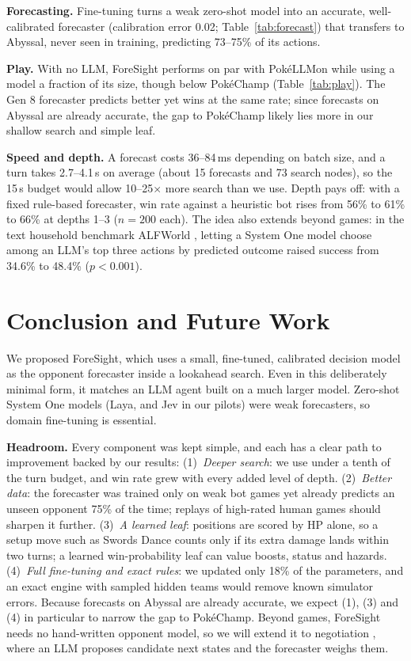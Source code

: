 \documentclass[letterpaper]{article} %
\begin{document}
\textbf{Forecasting.} Fine-tuning turns a weak zero-shot model into an accurate, well-calibrated forecaster (calibration error 0.02; Table~\ref{tab:forecast}) that transfers to Abyssal, never seen in training, predicting 73--75\% of its actions.

\textbf{Play.} With no LLM, ForeSight performs on par with PokéLLMon while using a model a fraction of its size, though below PokéChamp (Table~\ref{tab:play}). The Gen 8 forecaster predicts better yet wins at the same rate; since forecasts on Abyssal are already accurate, the gap to PokéChamp likely lies more in our shallow search and simple leaf.

\textbf{Speed and depth.} A forecast costs 36--84\,ms depending on batch size, and a turn takes 2.7--4.1\,s on average (about 15 forecasts and 73 search nodes), so the 15\,s budget would allow 10--25$\times$ more search than we use. Depth pays off: with a fixed rule-based forecaster, win rate against a heuristic bot rises from 56\% to 61\% to 66\% at depths 1--3 ($n{=}200$ each). The idea also extends beyond games: in the text household benchmark ALFWorld \citep{alfworld}, letting a System One model choose among an LLM's top three actions by predicted outcome raised success from 34.6\% to 48.4\% ($p{<}0.001$).

\section{Conclusion and Future Work}
We proposed ForeSight, which uses a small, fine-tuned, calibrated decision model as the opponent forecaster inside a lookahead search. Even in this deliberately minimal form, it matches an LLM agent built on a much larger model. Zero-shot System One models (Laya, and Jev in our pilots) were weak forecasters, so domain fine-tuning is essential.

\textbf{Headroom.} Every component was kept simple, and each has a clear path to improvement backed by our results:
(1)~\emph{Deeper search}: we use under a tenth of the turn budget, and win rate grew with every added level of depth.
(2)~\emph{Better data}: the forecaster was trained only on weak bot games yet already predicts an unseen opponent 75\% of the time; replays of high-rated human games \citep{metamon} should sharpen it further.
(3)~\emph{A learned leaf}: positions are scored by HP alone, so a setup move such as Swords Dance counts only if its extra damage lands within two turns; a learned win-probability leaf can value boosts, status and hazards.
(4)~\emph{Full fine-tuning and exact rules}: we updated only 18\% of the parameters, and an exact engine \citep{pokeengine} with sampled hidden teams would remove known simulator errors.
Because forecasts on Abyssal are already accurate, we expect (1), (3) and (4) in particular to narrow the gap to PokéChamp. Beyond games, ForeSight needs no hand-written opponent model, so we will extend it to negotiation \citep{dealornodeal}, where an LLM proposes candidate next states and the forecaster weighs them.


\end{document}
